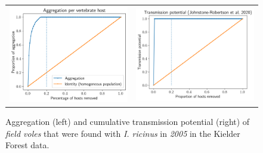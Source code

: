 \documentclass{article}
\begin{document}
\begin{figure}[]
	\begin{mdframed}[backgroundcolor=grey250,rightline=false,leftline=false,topline=false]
	\centering
	\begin{tabular}{ll}
		\includegraphics[width=.48\linewidth,valign=m]{lorenz_aggregation_FV_2005_I.Ricinus} & \includegraphics[width=.48\linewidth,valign=m]{lorenz_JR_FV_2005_I.Ricinus} \\
	\end{tabular}
	\caption{Aggregation (left) and cumulative transmission potential (right) of \textit{field voles} that were found with \textit{I. ricinus} in \textit{2005} in the Kielder Forest data.}
	\label{fig:lorenz_2005_iricinus_FV}
	\end{mdframed}
\end{figure}
\end{document}

